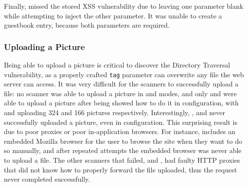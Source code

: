 Finally, \waf{} missed the stored XSS vulnerability due to leaving one parameter blank
while attempting to inject the other parameter. It was unable to create a
guestbook entry, because both parameters are required. 


% 
\subsubsection{Uploading a Picture}
Being able to upload a picture is critical to discover the
Directory Traversal vulnerability, as a properly crafted {\tt tag} parameter
can overwrite any file the web server can access. 
It was very difficult for the scanners to successfully upload a file:
no scanner was able to upload a picture in \initial{} and \config{} modes,
and only \appscan{} and \webinspect{} were able to upload a picture
after being showed how to do it in \manual{}
configuration, with \appscan{} and \webinspect{} uploading 324 and 166
pictures respectively. Interestingly, \hailstorm{}, \nstalker{} and
\ntospider{} never successfully 
uploaded a picture, even in \manual{} configuration. This surprising result is
due to poor proxies or poor in-application browsers. For instance, \hailstorm{}
includes an embedded Mozilla browser for the user to browse the site when they
want to do so manually, and after repeated attempts the embedded browser
was never able to upload a file. The other scanners that failed, \nstalker{} and
\ntospider{}, had faulty HTTP proxies
that did not know how to properly forward the file uploaded, thus the request
never completed successfully. 

